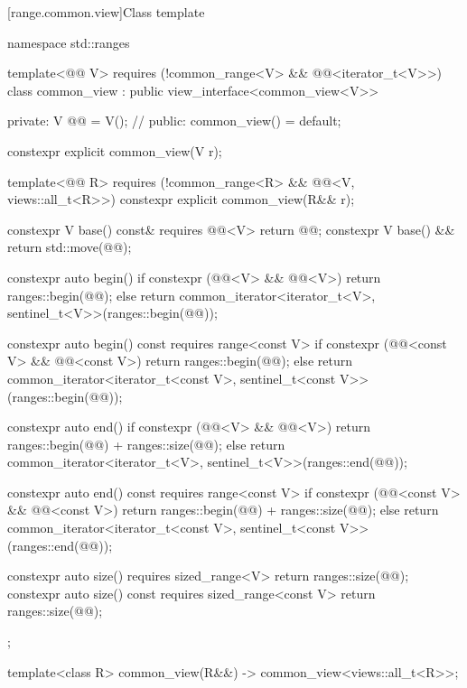 [range.common.view]{Class template }

%
%
%
%
%
\begin{codeblock}
namespace std::ranges {
  template<@@ V>
    requires (!common_range<V> && @@<iterator_t<V>>)
  class common_view : public view_interface<common_view<V>> {
  private:
    V @@ = V();  // \expos
  public:
    common_view() = default;

    constexpr explicit common_view(V r);

    template<@@ R>
      requires (!common_range<R> && @@<V, views::all_t<R>>)
    constexpr explicit common_view(R&& r);

    constexpr V base() const& requires @@<V> { return @@; }
    constexpr V base() && { return std::move(@@); }

    constexpr auto begin() {
      if constexpr (@@<V> && @@<V>)
        return ranges::begin(@@);
      else
        return common_iterator<iterator_t<V>, sentinel_t<V>>(ranges::begin(@@));
    }

    constexpr auto begin() const requires range<const V> {
      if constexpr (@@<const V> && @@<const V>)
        return ranges::begin(@@);
      else
        return common_iterator<iterator_t<const V>, sentinel_t<const V>>(ranges::begin(@@));
    }

    constexpr auto end() {
      if constexpr (@@<V> && @@<V>)
        return ranges::begin(@@) + ranges::size(@@);
      else
        return common_iterator<iterator_t<V>, sentinel_t<V>>(ranges::end(@@));
    }

    constexpr auto end() const requires range<const V> {
      if constexpr (@@<const V> && @@<const V>)
        return ranges::begin(@@) + ranges::size(@@);
      else
        return common_iterator<iterator_t<const V>, sentinel_t<const V>>(ranges::end(@@));
    }

    constexpr auto size() requires sized_range<V> {
      return ranges::size(@@);
    }
    constexpr auto size() const requires sized_range<const V> {
      return ranges::size(@@);
    }
  };

  template<class R>
    common_view(R&&) -> common_view<views::all_t<R>>;
}
\end{codeblock}

